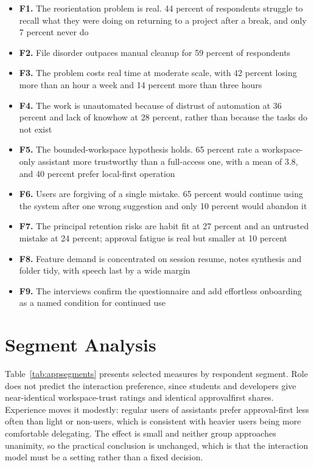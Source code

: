 \documentclass{FastFyp}
\begin{document}
\begin{itemize}
    \item \textbf{F1.} The reorientation problem is real. 44 percent of respondents struggle to recall what they were doing on returning to a project after a break, and only 7 percent never do
    \item \textbf{F2.} File disorder outpaces manual cleanup for 59 percent of respondents
    \item \textbf{F3.} The problem costs real time at moderate scale, with 42 percent losing more than an hour a week and 14 percent more than three hours
    \item \textbf{F4.} The work is unautomated because of distrust of automation at 36 percent and lack of knowhow at 28 percent, rather than because the tasks do not exist
    \item \textbf{F5.} The bounded-workspace hypothesis holds. 65 percent rate a workspace-only assistant more trustworthy than a full-access one, with a mean of 3.8, and 40 percent prefer local-first operation
    \item \textbf{F6.} Users are forgiving of a single mistake. 65 percent would continue using the system after one wrong suggestion and only 10 percent would abandon it
    \item \textbf{F7.} The principal retention risks are habit fit at 27 percent and an untrusted mistake at 24 percent; approval fatigue is real but smaller at 10 percent
    \item \textbf{F8.} Feature demand is concentrated on session resume, notes synthesis and folder tidy, with speech last by a wide margin
    \item \textbf{F9.} The interviews confirm the questionnaire and add effortless onboarding as a named condition for continued use
\end{itemize}

\section{Segment Analysis}
Table~\ref{tab:appsegments} presents selected measures by respondent segment. Role does not predict the interaction preference, since students and developers give near-identical workspace-trust ratings and identical approvalfirst shares. Experience moves it modestly: regular users of assistants prefer approval-first less often than light or non-users, which is consistent with heavier users being more comfortable delegating. The effect is small and neither group approaches unanimity, so the practical conclusion is unchanged, which is that the interaction model must be a setting rather than a fixed decision.
\end{document}
